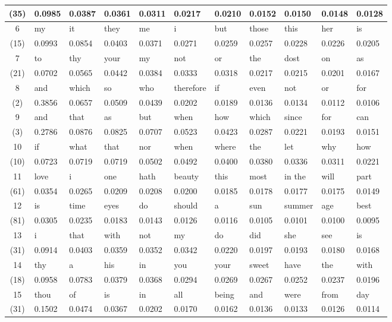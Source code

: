 \begin{table}[H]
\begin{tabular}{c||l|l|l|l|l|l|l|l|l|l}
		(35) & 0.0985 & 0.0387 & 0.0361 & 0.0311 & 0.0217 & 0.0210 & 0.0152 & 0.0150 & 0.0148 & 0.0128 \\ \hline
		6 & my & it & they & me & i & but & those & this & her & is \\
		(15) & 0.0993 & 0.0854 & 0.0403 & 0.0371 & 0.0271 & 0.0259 & 0.0257 & 0.0228 & 0.0226 & 0.0205 \\ \hline
		7 & to & thy & your & my & not & or & the & dost & on & as \\
		(21) & 0.0702 & 0.0565 & 0.0442 & 0.0384 & 0.0333 & 0.0318 & 0.0217 & 0.0215 & 0.0201 & 0.0167 \\ \hline
		8 & and & which & so & who & therefore & if & even & not & or & for \\
		(2) & 0.3856 & 0.0657 & 0.0509 & 0.0439 & 0.0202 & 0.0189 & 0.0136 & 0.0134 & 0.0112 & 0.0106 \\ \hline
		9 & and & that & as & but & when & how & which & since & for & can \\
		(3) & 0.2786 & 0.0876 & 0.0825 & 0.0707 & 0.0523 & 0.0423 & 0.0287 & 0.0221 & 0.0193 & 0.0151 \\ \hline
		10 & if & what & that & nor & when & where & the & let & why & how \\
		(10) & 0.0723 & 0.0719 & 0.0719 & 0.0502 & 0.0492 & 0.0400 & 0.0380 & 0.0336 & 0.0311 & 0.0221 \\ \hline
		11 & love & i & one & hath & beauty & this & most & in the & will & part \\
		(61) & 0.0354 & 0.0265 & 0.0209 & 0.0208 & 0.0200 & 0.0185 & 0.0178 & 0.0177 & 0.0175 & 0.0149 \\ \hline
		12 & is & time & eyes & do & should & a & sun & summer & age & best \\
		(81) & 0.0305 & 0.0235 & 0.0183 & 0.0143 & 0.0126 & 0.0116 & 0.0105 & 0.0101 & 0.0100 & 0.0095 \\ \hline
		13 & i & that & with & not & my & do & did & she & see & is \\
		(31) & 0.0914 & 0.0403 & 0.0359 & 0.0352 & 0.0342 & 0.0220 & 0.0197 & 0.0193 & 0.0180 & 0.0168 \\ \hline
		14 & thy & a & his & in & you & your & sweet & have & the & with \\
		(18) & 0.0958 & 0.0783 & 0.0379 & 0.0368 & 0.0294 & 0.0269 & 0.0267 & 0.0252 & 0.0237 & 0.0196 \\ \hline
		15 & thou & of & is & in & all & being & and & were & from & day \\
		(31) & 0.1502 & 0.0474 & 0.0367 & 0.0202 & 0.0170 & 0.0162 & 0.0136 & 0.0133 & 0.0126 & 0.0114 \\ \hline

\end{tabular}
\end{table}

